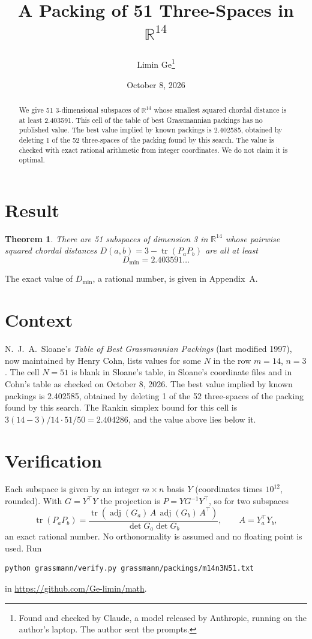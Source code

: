 \documentclass[11pt,a4paper]{article}
\title{A Packing of 51 Three-Spaces in $\mathbb{R}^{14}$}
\author{Limin Ge\thanks{Found and checked by Claude, a model released by Anthropic, running on the author's laptop. The author sent the prompts.}}
\date{October 8, 2026}
\newtheorem*{theorem}{Theorem}
\begin{document}
\maketitle
\begin{abstract}
We give 51 3-dimensional subspaces of $\mathbb{R}^{14}$ whose smallest squared chordal distance is at least 2.403591. This cell of the table of best Grassmannian packings has no published value. The best value implied by known packings is 2.402585, obtained by deleting 1 of the 52 three-spaces of the packing found by this search. The value is checked with exact rational arithmetic from integer coordinates. We do not claim it is optimal.
\end{abstract}

\section{Result}
\begin{theorem}
There are 51 subspaces of dimension 3 in $\mathbb{R}^{14}$ whose pairwise squared chordal distances $D(a,b) = 3 - \operatorname{tr}(P_aP_b)$ are all at least
\[ D_{\min} = 2.403591\ldots \]
\end{theorem}
The exact value of $D_{\min}$, a rational number, is given in Appendix~A.


\section{Context}
N.~J.~A.~Sloane's \emph{Table of Best Grassmannian Packings} (last modified 1997), now maintained by Henry Cohn, lists values for some $N$ in the row $m=14$, $n=3$. The cell $N=51$ is blank in Sloane's table, in Sloane's coordinate files and in Cohn's table as checked on October 8, 2026. The best value implied by known packings is 2.402585, obtained by deleting 1 of the 52 three-spaces of the packing found by this search. The Rankin simplex bound for this cell is $3(14-3)/14\cdot 51/50 = 2.404286$, and the value above lies below it.


\section{Verification}
Each subspace is given by an integer $m\times n$ basis $Y$ (coordinates times $10^{12}$, rounded). With $G=Y^\top Y$ the projection is $P=YG^{-1}Y^\top$, so for two subspaces
\[ \operatorname{tr}(P_aP_b)=\frac{\operatorname{tr}(\operatorname{adj}(G_a)\,A\,\operatorname{adj}(G_b)\,A^\top)}{\det G_a\det G_b},\qquad A=Y_a^\top Y_b, \]
an exact rational number. No orthonormality is assumed and no floating point is used. Run
\begin{verbatim}
python grassmann/verify.py grassmann/packings/m14n3N51.txt
\end{verbatim}
in \url{https://github.com/Ge-limin/math}.
\end{document}

